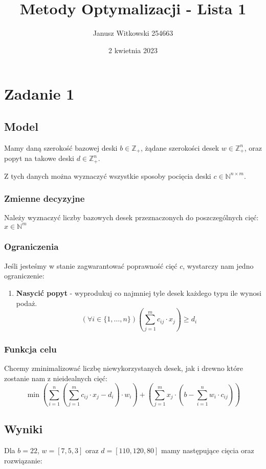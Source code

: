 \documentclass{article}
\title{Metody Optymalizacji - Lista 1}
\author{Janusz Witkowski 254663}
\date{2 kwietnia 2023}
\theoremstyle{definition}
\theoremstyle{remark}
\theoremstyle{plain}
\theoremstyle{remark}
\theoremstyle{plain}
\begin{document}
\maketitle

\section{Zadanie 1}
\subsection{Model}
Mamy daną szerokość bazowej deski $b\in \mathbb{Z}_+$, żądane szerokości desek $w\in \mathbb{Z}^n_+$, oraz popyt na takowe deski $d\in \mathbb{Z}_+^n$.

Z tych danych można wyznaczyć wszystkie sposoby pocięcia deski $c\in \mathbb{N}^{n\times m}$.
\subsubsection{Zmienne decyzyjne}
Należy wyznaczyć liczby bazowych desek przeznaczonych do poszczególnych cięć: $x\in \mathbb{N}^m$
\subsubsection{Ograniczenia}
Jeśli jesteśmy w stanie zagwarantować poprawność cięć $c$, wystarczy nam jedno ograniczenie:
\begin{enumerate}
    \item \textbf{Nasycić popyt} - wyprodukuj co najmniej tyle desek każdego typu ile wynosi podaż.
    \[ (\forall i \in \{1,\dots,n\}) \left(\sum_{j=1}^{m}{c_{ij}\cdot x_j} \right) \geq d_i \]
\end{enumerate}

\subsubsection{Funkcja celu}
Chcemy zminimalizować liczbę niewykorzystanych desek, jak i drewno które zostanie nam z nieidealnych cięć:
\[ \min \left(\sum_{i=1}^{n}{\left(\sum_{j=1}^{m}{c_{ij}\cdot x_j}-d_i\right)\cdot w_i}\right) + \left(\sum_{j=1}^m{x_j\cdot\left(b-\sum_{i=1}^n{w_i\cdot c_{ij}} \right)} \right) \]

\subsection{Wyniki}
Dla $b=22$, $w=[7, 5, 3]$ oraz $d=[110,120,80]$ mamy następujące cięcia oraz rozwiązanie:
\end{document}
